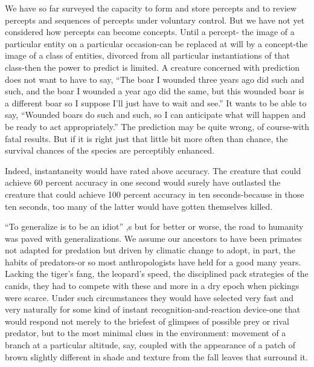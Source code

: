 We have so far surveyed the capacity to form and store percepts
and to review percepts and sequences of percepts under voluntary
control. But we have not yet considered how percepts can become concepts. Until a percept- the image of a particular entity on a par\-ticular occasion-can be replaced at will by a concept-the image of a class of entities, divorced from all particular instantiations of that class-then the power to predict is limited. A creature concerned with prediction does not want to have to say, ``The boar I wounded three years ago did such and such, and the boar I wounded a year ago did the same, but this wounded boar is a different boar so I suppose I'll just have to wait and see.'' It wants to be able to say, ``Wounded boars do such and such, so I can anticipate what will happen and be ready to act appropriately.'' The prediction may be quite wrong, of course-with fatal results. But if it is right just that little bit more often than chance, the survival chances of the species are perceptibly enhanced.

Indeed, instantaneity would have rated above accuracy. The creature that could achieve 60 percent accuracy in one second would surely have outlasted the creature that could achieve 100 percent accuracy in ten seconds-because in those ten seconds, too many of the latter would have gotten themselves killed.

``To generalize is to be an idiot'' \citep{Blake1808},s but for better or worse, the road to humanity was paved with generalizations. We assume our ancestors to have been primates not adapted for predation but driven by climatic change to adopt, in part, the habits of preda\-tors-or so most anthropologists have held for a good many years. Lacking the tiger's fang, the leopard's speed, the disciplined pack strategies of the canids, they had to compete with these and more in a dry epoch when pickings were scarce. Under such circumstances they would have selected very fast and very naturally for some kind of instant recognition-and-reaction device-one that would respond not merely to the briefest of glimpses of possible prey or rival predator, but to the most minimal clues in the environment: movement of a branch at a particular altitude, say, coupled with the appearance of a patch of brown slightly different in shade and texture from the fall leaves that surround it.


